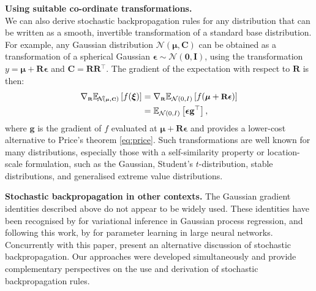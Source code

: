 \documentclass{article}
\newcommand{\E}{\mathbb{E}} %
\newcommand{\N}{\mathcal{N}} %
\newcommand{\myvec}[1]{\mbox{$\mathbf{#1}$}}
\newcommand{\myvecsym}[1]{\mbox{$\boldsymbol{#1}$}}
\newcommand{\vzero}{\mbox{$\myvecsym{0}$}}
\newcommand{\vepsilon}{\mbox{$\myvecsym{\epsilon}$}}
\newcommand{\vmu}{\mbox{$\myvecsym{\mu}$}}
\newcommand{\vxi}{\mbox{$\myvecsym{\xi}$}}
\newcommand{\vg}{\mbox{$\myvec{g}$}}
\newcommand{\vC}{\mbox{$\myvec{C}$}}
\newcommand{\vI}{\mbox{$\myvec{I}$}}
\newcommand{\vR}{\mbox{$\myvec{R}$}}
\begin{document}
\begin{bibunit}[icml2013]
\textbf{Using suitable co-ordinate transformations.} \\
We can also derive stochastic backpropagation rules for any distribution 
that can be written as a smooth, invertible  transformation of a standard base 
distribution. For example, any Gaussian distribution $\N(\vmu, \vC)$ can be 
obtained as a transformation of a spherical Gaussian $\vepsilon \sim 
\N(\vzero,\vI)$, using the transformation $y = \vmu + \vR \vepsilon$ and 
$\vC = \vR \vR\!^\top\!\!$. The gradient 
of the expectation with respect to $\vR$ is then:
\vspace{-2mm}
\begin{align}
\nabla_{\tiny{\vR}} \E_{\!\N\!\left(\tiny{\vmu,\vC}\right) } \left[ 
f(\vxi) \right ]  &=\nabla_{\tiny{\vR}} 
\E_{\tiny{\N(0,I)} } \left [ f(\small{\vmu + \vR \vepsilon}) 
\right ] \nonumber \\ 
 &= \E_{ \tiny{\N(0,I)} } \left [
\vepsilon  \vg^\top \right],  \label{eq:gradR}
\end{align}
where $\mathbf{g}$ is the gradient of $f$ evaluated at $\vmu + \vR \vepsilon$ and provides a lower-cost alternative to Price's theorem \eqref{eq:price}.
Such transformations are well known for many distributions, especially those 
with a self-similarity property or location-scale formulation, such as the 
Gaussian, Student's $t$-distribution, stable distributions, and generalised extreme value distributions.

\textbf{Stochastic backpropagation in other contexts.}
The Gaussian gradient identities described above do not appear to be widely used. These identities have been recognised by \citet{opper2009} for variational inference in Gaussian process regression, and following this work, by \citet{gravesNIPS2011} for parameter learning in large neural networks. 
Concurrently with this paper, \citet{kingma2013auto} present an alternative discussion of
stochastic backpropagation. Our approaches were developed simultaneously and provide complementary perspectives on the use and derivation of stochastic backpropagation rules. 
\vspace{-3mm}

\end{bibunit}
\end{document}
